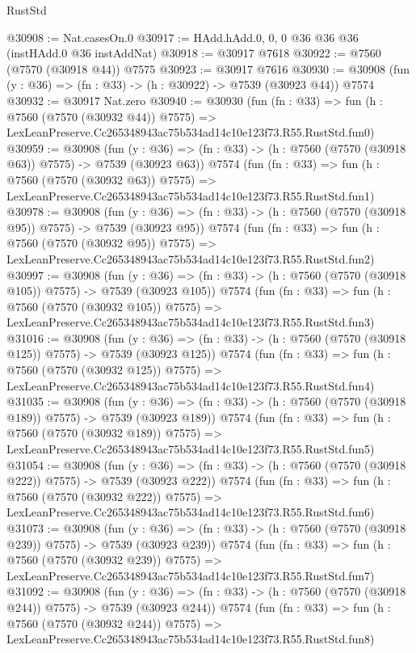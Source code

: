 \begin{lexlean}{RustStd}
\begin{coremodule}
@30908 := Nat.casesOn.{0}
@30917 := HAdd.hAdd.{0, 0, 0} @36 @36 @36 (instHAdd.{0} @36 instAddNat)
@30918 := @30917 @7618
@30922 := @7560 (@7570 (@30918 @44)) @7575
@30923 := @30917 @7616
@30930 := @30908 (fun (y : @36) => (fn : @33) -> (h : @30922) -> @7539 (@30923 @44)) @7574
@30932 := @30917 Nat.zero
@30940 := @30930
    (fun (fn : @33) =>
    fun (h : @7560 (@7570 (@30932 @44)) @7575) =>
    LexLeanPreserve.Cc265348943ac75b534ad14c10e123f73.R55.RustStd.fun0)
@30959 := @30908
    (fun (y : @36) => (fn : @33) -> (h : @7560 (@7570 (@30918 @63)) @7575) -> @7539 (@30923 @63))
    @7574
    (fun (fn : @33) =>
    fun (h : @7560 (@7570 (@30932 @63)) @7575) =>
    LexLeanPreserve.Cc265348943ac75b534ad14c10e123f73.R55.RustStd.fun1)
@30978 := @30908
    (fun (y : @36) => (fn : @33) -> (h : @7560 (@7570 (@30918 @95)) @7575) -> @7539 (@30923 @95))
    @7574
    (fun (fn : @33) =>
    fun (h : @7560 (@7570 (@30932 @95)) @7575) =>
    LexLeanPreserve.Cc265348943ac75b534ad14c10e123f73.R55.RustStd.fun2)
@30997 := @30908
    (fun (y : @36) => (fn : @33) -> (h : @7560 (@7570 (@30918 @105)) @7575) -> @7539 (@30923 @105))
    @7574
    (fun (fn : @33) =>
    fun (h : @7560 (@7570 (@30932 @105)) @7575) =>
    LexLeanPreserve.Cc265348943ac75b534ad14c10e123f73.R55.RustStd.fun3)
@31016 := @30908
    (fun (y : @36) => (fn : @33) -> (h : @7560 (@7570 (@30918 @125)) @7575) -> @7539 (@30923 @125))
    @7574
    (fun (fn : @33) =>
    fun (h : @7560 (@7570 (@30932 @125)) @7575) =>
    LexLeanPreserve.Cc265348943ac75b534ad14c10e123f73.R55.RustStd.fun4)
@31035 := @30908
    (fun (y : @36) => (fn : @33) -> (h : @7560 (@7570 (@30918 @189)) @7575) -> @7539 (@30923 @189))
    @7574
    (fun (fn : @33) =>
    fun (h : @7560 (@7570 (@30932 @189)) @7575) =>
    LexLeanPreserve.Cc265348943ac75b534ad14c10e123f73.R55.RustStd.fun5)
@31054 := @30908
    (fun (y : @36) => (fn : @33) -> (h : @7560 (@7570 (@30918 @222)) @7575) -> @7539 (@30923 @222))
    @7574
    (fun (fn : @33) =>
    fun (h : @7560 (@7570 (@30932 @222)) @7575) =>
    LexLeanPreserve.Cc265348943ac75b534ad14c10e123f73.R55.RustStd.fun6)
@31073 := @30908
    (fun (y : @36) => (fn : @33) -> (h : @7560 (@7570 (@30918 @239)) @7575) -> @7539 (@30923 @239))
    @7574
    (fun (fn : @33) =>
    fun (h : @7560 (@7570 (@30932 @239)) @7575) =>
    LexLeanPreserve.Cc265348943ac75b534ad14c10e123f73.R55.RustStd.fun7)
@31092 := @30908
    (fun (y : @36) => (fn : @33) -> (h : @7560 (@7570 (@30918 @244)) @7575) -> @7539 (@30923 @244))
    @7574
    (fun (fn : @33) =>
    fun (h : @7560 (@7570 (@30932 @244)) @7575) =>
    LexLeanPreserve.Cc265348943ac75b534ad14c10e123f73.R55.RustStd.fun8)

\end{coremodule}
\end{lexlean}
